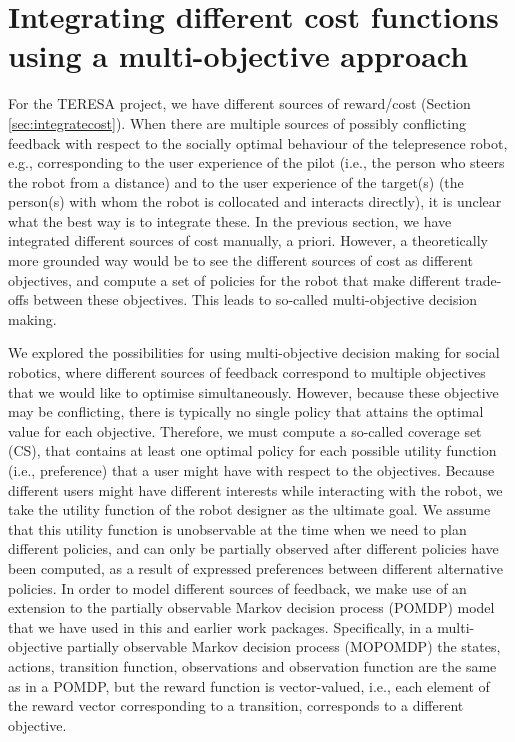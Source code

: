 \documentclass[a4paper,11pt]{report}
\begin{document}
\section{Integrating different cost functions using a multi-objective approach}
For the TERESA project, we have different sources of reward/cost (Section \ref{sec:integratecost}). When there are multiple sources of possibly conflicting feedback with respect to the socially optimal behaviour of the telepresence robot, e.g.,  corresponding to the user experience of the pilot (i.e., the person who steers the robot from a distance) and to the user experience of the target(s) (the person(s) with whom the robot is collocated and interacts directly), it is unclear what the best way is to integrate these. In the previous section, we have integrated different sources of cost manually, a priori. However, a theoretically more grounded way would be to see the different sources of cost as different objectives, and compute a set of policies for the robot that make different trade-offs between these objectives. This leads to so-called multi-objective decision making. 

We explored the possibilities for using multi-objective decision making for social robotics,  where different sources of feedback correspond to multiple objectives that we would like to optimise simultaneously. However, because these objective may be conflicting, there is typically no single policy that attains the optimal value for each objective. Therefore, we must compute a so-called coverage set (CS), that contains at least one optimal policy for each possible utility function (i.e., preference) that a user might have with respect to the objectives. Because different users might have different interests while interacting with the robot, we take the utility function of the robot designer as the ultimate goal. We assume that this utility function is unobservable at the time when we need to plan different policies, and can only be partially observed after different policies have been computed, as a result of expressed preferences between different alternative policies.
In order to model different sources of feedback, we make use of an extension to the partially observable Markov decision process (POMDP) model that we have used in this and earlier work packages. Specifically, in a multi-objective partially observable Markov decision process (MOPOMDP) the states, actions, transition function, observations and observation function are the same as in a POMDP, but the reward function is vector-valued, i.e., each element of the reward vector corresponding to a transition, corresponds to a different objective. 
\end{document}
